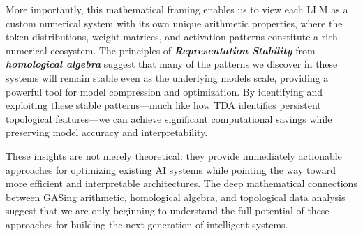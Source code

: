 More importantly, this mathematical framing enables us to view each LLM as a custom numerical system with its own unique arithmetic properties, where the token distributions, weight matrices, and activation patterns constitute a rich numerical ecosystem. The principles of \textbf{\textit{Representation Stability}} from \textbf{\textit{homological algebra}} suggest that many of the patterns we discover in these systems will remain stable even as the underlying models scale, providing a powerful tool for model compression and optimization. By identifying and exploiting these stable patterns—much like how TDA identifies persistent topological features—we can achieve significant computational savings while preserving model accuracy and interpretability.

These insights are not merely theoretical: they provide immediately actionable approaches for optimizing existing AI systems while pointing the way toward more efficient and interpretable architectures. The deep mathematical connections between GASing arithmetic, homological algebra, and topological data analysis suggest that we are only beginning to understand the full potential of these approaches for building the next generation of intelligent systems.